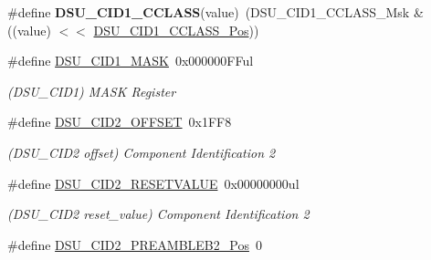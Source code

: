 \begin{DoxyCompactItemize}
\item 
\hypertarget{group___s_a_m_l21___d_s_u_gab1b3d33d5908526ca1032a0ac8d792a1}{}\#define {\bfseries D\+S\+U\+\_\+\+C\+I\+D1\+\_\+\+C\+C\+L\+A\+S\+S}(value)~(D\+S\+U\+\_\+\+C\+I\+D1\+\_\+\+C\+C\+L\+A\+S\+S\+\_\+\+Msk \& ((value) $<$$<$ \hyperlink{group___s_a_m_l21___d_s_u_gaa505d5dbcb38fd84adf608eaaa7948a6}{D\+S\+U\+\_\+\+C\+I\+D1\+\_\+\+C\+C\+L\+A\+S\+S\+\_\+\+Pos}))\label{group___s_a_m_l21___d_s_u_gab1b3d33d5908526ca1032a0ac8d792a1}

\item 
\hypertarget{group___s_a_m_l21___d_s_u_gab3c48e6716c2288f0cbecf4a4991dcff}{}\#define \hyperlink{group___s_a_m_l21___d_s_u_gab3c48e6716c2288f0cbecf4a4991dcff}{D\+S\+U\+\_\+\+C\+I\+D1\+\_\+\+M\+A\+S\+K}~0x000000\+F\+Ful\label{group___s_a_m_l21___d_s_u_gab3c48e6716c2288f0cbecf4a4991dcff}

\begin{DoxyCompactList}\small\item\em (D\+S\+U\+\_\+\+C\+I\+D1) M\+A\+S\+K Register \end{DoxyCompactList}\item 
\hypertarget{group___s_a_m_l21___d_s_u_gab07b638d6710bb917955217815dcd84e}{}\#define \hyperlink{group___s_a_m_l21___d_s_u_gab07b638d6710bb917955217815dcd84e}{D\+S\+U\+\_\+\+C\+I\+D2\+\_\+\+O\+F\+F\+S\+E\+T}~0x1\+F\+F8\label{group___s_a_m_l21___d_s_u_gab07b638d6710bb917955217815dcd84e}

\begin{DoxyCompactList}\small\item\em (D\+S\+U\+\_\+\+C\+I\+D2 offset) Component Identification 2 \end{DoxyCompactList}\item 
\hypertarget{group___s_a_m_l21___d_s_u_ga0276c33d43081b5c8cd478b611723f36}{}\#define \hyperlink{group___s_a_m_l21___d_s_u_ga0276c33d43081b5c8cd478b611723f36}{D\+S\+U\+\_\+\+C\+I\+D2\+\_\+\+R\+E\+S\+E\+T\+V\+A\+L\+U\+E}~0x00000000ul\label{group___s_a_m_l21___d_s_u_ga0276c33d43081b5c8cd478b611723f36}

\begin{DoxyCompactList}\small\item\em (D\+S\+U\+\_\+\+C\+I\+D2 reset\+\_\+value) Component Identification 2 \end{DoxyCompactList}\item 
\hypertarget{group___s_a_m_l21___d_s_u_ga755afb0dc289f0eeaaf805636836da72}{}\#define \hyperlink{group___s_a_m_l21___d_s_u_ga755afb0dc289f0eeaaf805636836da72}{D\+S\+U\+\_\+\+C\+I\+D2\+\_\+\+P\+R\+E\+A\+M\+B\+L\+E\+B2\+\_\+\+Pos}~0\label{group___s_a_m_l21___d_s_u_ga755afb0dc289f0eeaaf805636836da72}


\end{DoxyCompactItemize}
